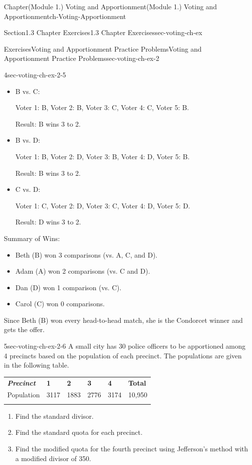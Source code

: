 \documentclass[oneside,10pt,]{book}
\newcommand{\tabularfont}{\relax}
\newcommand{\ptxlistdisc}{\raisebox{0.3ex}{\textbullet}}
\newcommand{\alert}[1]{\textbf{\textit{#1}}}
\newcommand{\hrulethin}  {\noalign{\hrule height 0.04em}}
\begin{document}
\begin{chapterptx}{Chapter}{(Module 1.) Voting and Apportionment}{}{(Module 1.) Voting and Apportionment}{}{}{ch-Voting-Apportionment}
\begin{sectionptx}{Section}{1.3 Chapter Exercises}{}{1.3 Chapter Exercises}{}{}{sec-voting-ch-ex}
\begin{exercises-subsection-numberless}{Exercises}{Voting and Apportionment Practice Problems}{}{Voting and Apportionment Practice Problems}{}{}{sec-voting-ch-ex-2}
\begin{divisionexercise}{4}{}{}{sec-voting-ch-ex-2-5}
\begin{itemize}[label=\ptxlistdisc]
Result: A wins 3 to 2.%
\item{}B vs. C:%
\par
Voter 1: B, Voter 2: B, Voter 3: C, Voter 4: C, Voter 5: B.%
\par
Result: B wins 3 to 2.%
\item{}B vs. D:%
\par
Voter 1: B, Voter 2: D, Voter 3: B, Voter 4: D, Voter 5: B.%
\par
Result: B wins 3 to 2.%
\item{}C vs. D:%
\par
Voter 1: C, Voter 2: D, Voter 3: C, Voter 4: D, Voter 5: D.%
\par
Result: D wins 3 to 2.%
\end{itemize}
%
\par
Summary of Wins:%
\begin{itemize}[label=\ptxlistdisc]
\item{}Beth (B) won 3 comparisons (vs. A, C, and D).%
\item{}Adam (A) won 2 comparisons (vs. C and D).%
\item{}Dan (D) won 1 comparison (vs. C).%
\item{}Carol (C) won 0 comparisons.%
\end{itemize}
%
\par
Since Beth (B) won every head-to-head match, she is the Condorcet winner and gets the offer.%
\end{divisionexercise}%
\begin{divisionexercise}{5}{}{}{sec-voting-ch-ex-2-6}%
A small city has 30 police officers to be apportioned among 4 precincts based on the population of each precinct. The populations are given in the following table.%
\begin{center}%
{\tabularfont%
\begin{tabular}{llllll}\hrulethin
{\bfseries{}\alert{Precinct}}&{\bfseries{}1}&{\bfseries{}2}&{\bfseries{}3}&{\bfseries{}4}&{\bfseries{}Total}\tabularnewline\hrulethin
Population&3117&1883&2776&3174&10,950\tabularnewline\hrulethin
\end{tabular}
}%
\end{center}%
%
\begin{enumerate}[label={(\alph*)}]
\item{}Find the standard divisor.%
\item{}Find the standard quota for each precinct.%
\item{}Find the modified quota for the fourth precinct using Jefferson's method with a modified divisor of 350.%

\end{enumerate}
\end{divisionexercise}
\end{exercises-subsection-numberless}
\end{sectionptx}
\end{chapterptx}
\end{document}
